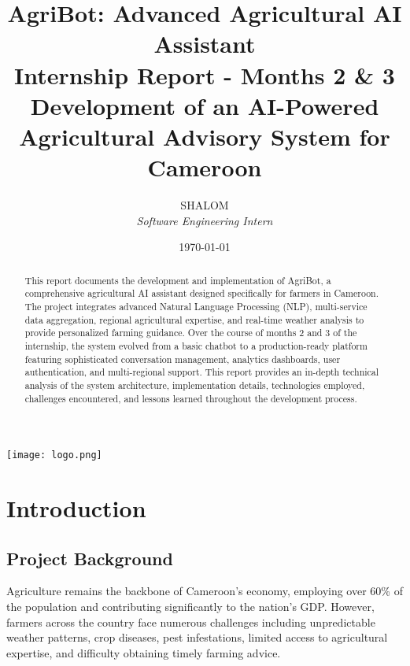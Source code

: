 \documentclass[12pt,a4paper]{article}
\title{
    \LARGE\textbf{AgriBot: Advanced Agricultural AI Assistant} \\
    \vspace{0.5cm}
    \Large Internship Report - Months 2 \& 3 \\
    \vspace{0.3cm}
    \large Development of an AI-Powered Agricultural Advisory System for Cameroon
}
\author{
    SHALOM \\
    \textit{Software Engineering Intern}
}
\date{\today}
\begin{document}
\maketitle
\thispagestyle{empty}

\vspace{2cm}

\begin{center}
\texttt{[image: logo.png]} %
\end{center}

\vspace{2cm}

\begin{abstract}
This report documents the development and implementation of AgriBot, a comprehensive agricultural AI assistant designed specifically for farmers in Cameroon. The project integrates advanced Natural Language Processing (NLP), multi-service data aggregation, regional agricultural expertise, and real-time weather analysis to provide personalized farming guidance. Over the course of months 2 and 3 of the internship, the system evolved from a basic chatbot to a production-ready platform featuring sophisticated conversation management, analytics dashboards, user authentication, and multi-regional support. This report provides an in-depth technical analysis of the system architecture, implementation details, technologies employed, challenges encountered, and lessons learned throughout the development process.
\end{abstract}

\newpage

\tableofcontents
\newpage

\listoffigures
\listoftables
\newpage

\section{Introduction}

\subsection{Project Background}

Agriculture remains the backbone of Cameroon's economy, employing over 60\% of the population and contributing significantly to the nation's GDP. However, farmers across the country face numerous challenges including unpredictable weather patterns, crop diseases, pest infestations, limited access to agricultural expertise, and difficulty obtaining timely farming advice.
\end{document}
